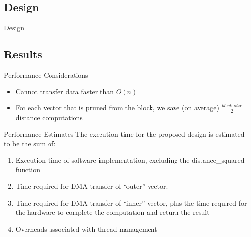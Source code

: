 \subsection{Design}
\begin{frame}[label=design]{Design}
\end{frame}

\subsection{Results}
\begin{frame}[label=performance-considerations]{Performance Considerations}
    \begin{itemize}
        \item Cannot transfer data faster than $O(n)$
        \item For each vector that is pruned from the block, we save (on
            average) $\frac{block\_size}{2}$ distance computations
    \end{itemize}
\end{frame}

\begin{frame}[label=performance-estimates]{Performance Estimates}
    The execution time for the proposed design is estimated to be the sum of:
    \begin{enumerate}[<+->]
        \item Execution time of software implementation, excluding the
            distance\_squared function
        \item Time required for DMA transfer of ``outer'' vector.
        \item Time required for DMA transfer of ``inner'' vector, plus the time
            required for the hardware to complete the computation and return the
            result
        \item Overheads associated with thread management
    \end{enumerate}
\end{frame}


